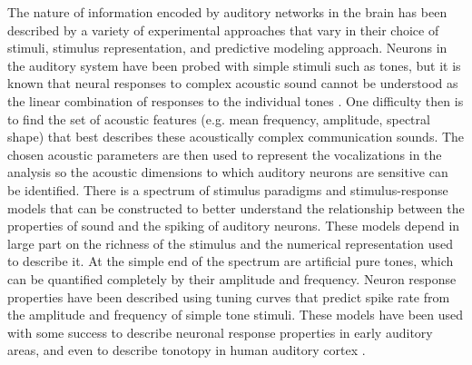 The nature of information encoded by auditory networks in the brain has been described by a variety of experimental approaches that vary in their choice of stimuli, stimulus representation, and predictive modeling approach. Neurons in the auditory system have been probed with simple stimuli such as tones, but it is known that neural responses to complex acoustic sound cannot be understood as the linear combination of responses to the individual tones \cite{Theunissen2000}. One difficulty then is to find the set of acoustic features (e.g. mean frequency, amplitude, spectral shape) that best describes these acoustically complex communication sounds. The chosen acoustic parameters are then used to represent the vocalizations in the analysis so the acoustic dimensions to which auditory neurons are sensitive can be identified. 
There is a spectrum of stimulus paradigms and stimulus-response models that can be constructed to better understand the relationship between the properties of sound and the spiking of auditory neurons. These models depend in large part on the richness of the stimulus and the numerical representation used to describe it. At the simple end of the spectrum are artificial pure tones, which can be quantified completely by their amplitude and frequency. Neuron response properties have been described using tuning curves that predict spike rate from the amplitude and frequency of simple tone stimuli. These models have been used with some success to describe neuronal response properties in early auditory areas, and even to describe tonotopy in human auditory cortex \cite{Formisano2003}.

